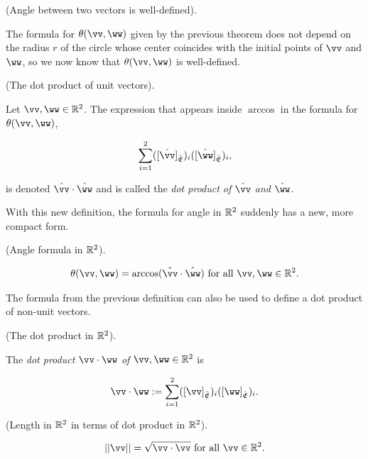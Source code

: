 \begin{theorem}
    (Angle between two vectors is well-defined).

    The formula for $\theta(\vv, \ww)$ given by the previous theorem does not depend on the radius $r$ of the circle whose center coincides with the initial points of $\vv$ and $\ww$, so we now know that $\theta(\vv, \ww)$ is well-defined.
\end{theorem}

\begin{defn}
    (The dot product of unit vectors).

    Let $\vv, \ww \in \R^2$. The expression that appears inside $\arccos$ in the formula for $\theta(\vv, \ww)$,

    \begin{align*}
        \sum_{i = 1}^2 ([\hvv]_\sE)_i  ([\hww]_\sE)_i,
    \end{align*}
    
    is denoted $\hvv \cdot \hww$ and is called the \textit{dot product of $\hvv$ and $\hww$}. 
\end{defn}

With this new definition, the formula for angle in $\mathbb{R}^2$ suddenly has a new, more compact form.

\begin{theorem}
    (Angle formula in $\mathbb{R}^2$).

    \begin{align*}
        \theta(\vv, \ww) = \arccos(\hvv \cdot \hww) \text{ for all $\vv, \ww \in \R^2$}.
    \end{align*}
\end{theorem}

The formula from the previous definition can also be used to define a dot product of non-unit vectors.

\begin{defn}
    (The dot product in $\mathbb{R}^2$). 

    The \textit{dot product $\vv \cdot \ww$ of $\vv, \ww \in \R^2$} is
    
    \begin{align*}
        \vv \cdot \ww := \sum_{i = 1}^2 ([\vv]_\sE)_i  ([\ww]_\sE)_i.
    \end{align*}    
\end{defn}

\begin{theorem}
    (Length in $\mathbb{R}^2$ in terms of dot product in $\mathbb{R}^2$).

    \begin{align*}
        ||\vv|| = \sqrt{\vv \cdot \vv} \text{ for all $\vv \in \R^2$}.
    \end{align*}
\end{theorem}

